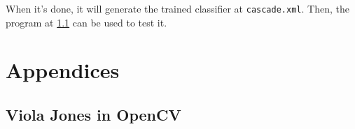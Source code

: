 \documentclass[a4paper]{article}
\begin{document}
When it's done, it will generate the trained classifier at \texttt{cascade.xml}. Then, the program at \ref{app:viola_jones_cv} can be used to test it.


\newpage
\appendix

\section{Appendices}

\newpage
\subsection{Viola Jones in OpenCV}
\label{app:viola_jones_cv}




\newpage
\printbibliography
\end{document}

